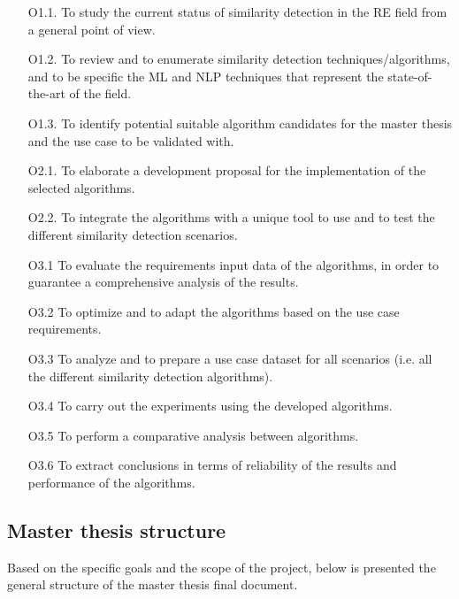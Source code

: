 \documentclass[11pt]{article}
\begin{document}
\begin{enumerate}
\item[O1.1.] To study the current status of similarity detection in the RE field from a general point of view.
\item[O1.2.] To review and to enumerate similarity detection techniques/algorithms, and to be specific the ML and NLP techniques that represent the state-of-the-art of the field.
\item[O1.3.] To identify potential suitable algorithm candidates for the master thesis and the use case to be validated with.
\item[O2.1.] To elaborate a development proposal for the implementation of the selected algorithms.
\item[O2.2.] To integrate the algorithms with a unique tool to use and to test the different similarity detection scenarios.
\item[O3.1] To evaluate the requirements input data of the algorithms, in order to guarantee a comprehensive analysis of the results.
\item[O3.2] To optimize and to adapt the algorithms based on the use case requirements.
\item[O3.3] To analyze and to prepare a use case dataset for all scenarios (i.e. all the different similarity detection algorithms).
\item[O3.4] To carry out the experiments using the developed algorithms.
\item[O3.5] To perform a comparative analysis between algorithms.
\item[O3.6] To extract conclusions in terms of reliability of the results and performance of the algorithms.
\end{enumerate}

\subsection{Master thesis structure}

Based on the specific goals and the scope of the project, below is presented the general structure of the master thesis final document.
\end{document}
